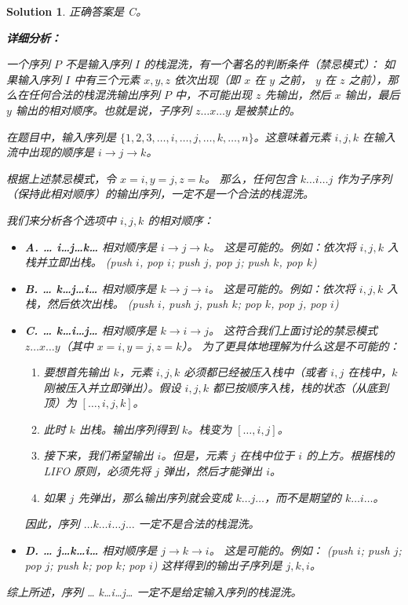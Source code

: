 \documentclass[UTF8]{report}
\newtheorem{solution}{Solution}
\theoremstyle{MyLineTheoremStyle} %
\theoremstyle{MyBlockTheoremStyle} %
\theoremstyle{MySubsubsectionStyle} %
\begin{document}
\begin{solution}
正确答案是 C。

\textbf{详细分析：}

一个序列 $P$ 不是输入序列 $I$ 的栈混洗，有一个著名的判断条件（禁忌模式）：
如果输入序列 $I$ 中有三个元素 $x, y, z$ 依次出现（即 $x$ 在 $y$ 之前， $y$ 在 $z$ 之前），那么在任何合法的栈混洗输出序列 $P$ 中，不可能出现 $z$ 先输出，然后 $x$ 输出，最后 $y$ 输出的相对顺序。也就是说，子序列 $z \ldots x \ldots y$ 是被禁止的。

在题目中，输入序列是 $\{1, 2, 3, \ldots, i, \ldots, j, \ldots, k, \ldots, n\}$。这意味着元素 $i, j, k$ 在输入流中出现的顺序是 $i \rightarrow j \rightarrow k$。

根据上述禁忌模式，令 $x=i, y=j, z=k$。
那么，任何包含 $k \ldots i \ldots j$ 作为子序列（保持此相对顺序）的输出序列，一定不是一个合法的栈混洗。

我们来分析各个选项中 $i, j, k$ 的相对顺序：
\begin{itemize}
    \item \textbf{A. {… i…j…k…}}
        相对顺序是 $i \rightarrow j \rightarrow k$。
        这是可能的。例如：依次将 $i, j, k$ 入栈并立即出栈。
        (push $i$, pop $i$; push $j$, pop $j$; push $k$, pop $k$)

    \item \textbf{B. {… k…j…i…}}
        相对顺序是 $k \rightarrow j \rightarrow i$。
        这是可能的。例如：依次将 $i, j, k$ 入栈，然后依次出栈。
        (push $i$, push $j$, push $k$; pop $k$, pop $j$, pop $i$)

    \item \textbf{C. {… k…i…j…}}
        相对顺序是 $k \rightarrow i \rightarrow j$。
        这符合我们上面讨论的禁忌模式 $z \ldots x \ldots y$（其中 $x=i, y=j, z=k$）。
        为了更具体地理解为什么这是不可能的：
        \begin{enumerate}
            \item 要想首先输出 $k$，元素 $i, j, k$ 必须都已经被压入栈中（或者 $i,j$ 在栈中，$k$ 刚被压入并立即弹出）。假设 $i, j, k$ 都已按顺序入栈，栈的状态（从底到顶）为 $[\ldots, i, j, k]$。
            \item 此时 $k$ 出栈。输出序列得到 $k$。栈变为 $[\ldots, i, j]$。
            \item 接下来，我们希望输出 $i$。但是，元素 $j$ 在栈中位于 $i$ 的上方。根据栈的 LIFO 原则，必须先将 $j$ 弹出，然后才能弹出 $i$。
            \item 如果 $j$ 先弹出，那么输出序列就会变成 $k \ldots j \ldots$，而不是期望的 $k \ldots i \ldots$。
        \end{enumerate}
        因此，序列 ${… k…i…j…}$ 一定不是合法的栈混洗。

    \item \textbf{D. {… j…k…i…}}
        相对顺序是 $j \rightarrow k \rightarrow i$。
        这是可能的。例如：
        (push $i$; push $j$; pop $j$; push $k$; pop $k$; pop $i$)
        这样得到的输出子序列是 $j, k, i$。
\end{itemize}

综上所述，序列 {… k…i…j…} 一定不是给定输入序列的栈混洗。
\end{solution}
\end{document}

